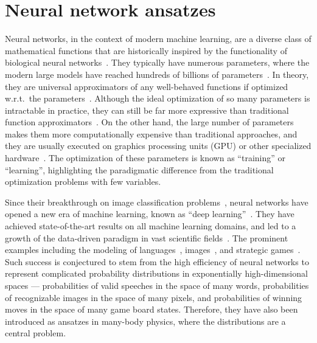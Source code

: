\section{Neural network ansatzes}


Neural networks, in the context of modern machine learning, are a diverse class of mathematical functions that are historically inspired by the functionality of biological neural networks~\cite{mackay2003information, goodfellow2016deep}. They typically have numerous parameters, where the modern large models have reached hundreds of billions of parameters~\cite{brown2020language}. In theory, they are universal approximators of any well-behaved functions if optimized w.r.t.\ the parameters~\cite{hornik1989multilayer}. Although the ideal optimization of so many parameters is intractable in practice, they can still be far more expressive than traditional function approximators~\cite{sontag1998vc}. On the other hand, the large number of parameters makes them more computationally expensive than traditional approaches, and they are usually executed on graphics processing units (GPU) or other specialized hardware~\cite{chen2020survey}. The optimization of these parameters is known as ``training'' or ``learning'', highlighting the paradigmatic difference from the traditional optimization problems with few variables.

Since their breakthrough on image classification problems~\cite{krizhevsky2012imagenet}, neural networks have opened a new era of machine learning, known as ``deep learning''~\cite{goodfellow2016deep}. They have achieved state-of-the-art results on all machine learning domains, and led to a growth of the data-driven paradigm in vast scientific fields~\cite{montans2019data}. The prominent examples including the modeling of languages~\cite{brown2020language}, images~\cite{rombach2022high}, and strategic games~\cite{silver2016mastering}. Such success is conjectured to stem from the high efficiency of neural networks to represent complicated probability distributions in exponentially high-dimensional spaces --- probabilities of valid speeches in the space of many words, probabilities of recognizable images in the space of many pixels, and probabilities of winning moves in the space of many game board states. Therefore, they have also been introduced as ansatzes in many-body physics, where the distributions are a central problem.

